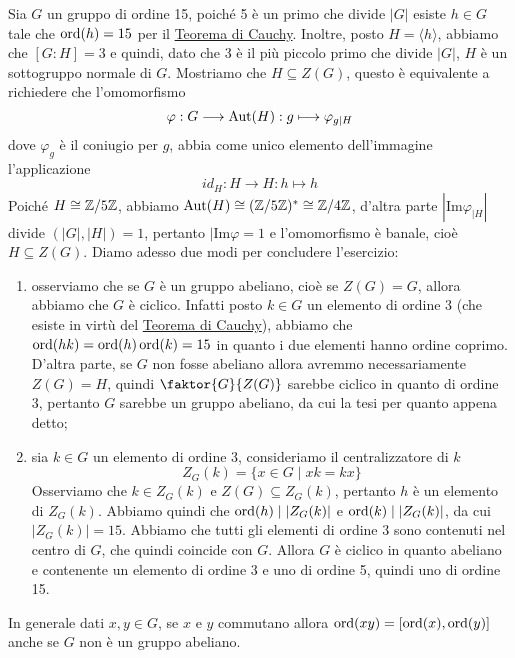 \documentclass[11pt]{scrartcl}
\begin{document}
\begin{soln}
    Sia $G$ un gruppo di ordine 15, poiché 5 è un primo che divide $|G|$
    esiste $h \in G$ tale che $\operatorname{ord}(h) = 15$ per il \hyperref[teorema1.44]{Teorema di Cauchy}.
    Inoltre, posto $H = \langle h\rangle$, abbiamo che $[G:H] = 3$ e quindi,
    dato che 3 è il più piccolo primo che divide $|G|$, $H$ è un sottogruppo 
    normale di $G$. Mostriamo che $H \subseteq Z(G)$, questo è equivalente a 
    richiedere che l'omomorfismo \[
        \varphi: G\longrightarrow \operatorname{Aut}(H) :g\longmapsto \varphi_{g\mid H}
    \]
    dove $\varphi_g$ è il coniugio per $g$, abbia come unico elemento dell'immagine
    l'applicazione
    \[
        id_H:H\longrightarrow H: h \longmapsto h
    \]
    Poiché $H \cong \mathbb{Z}/{5}\mathbb{Z}$, abbiamo $\operatorname{Aut}(H)\cong (\mathbb{Z}/{5}\mathbb{Z})^* \cong \mathbb{Z}/{4}\mathbb{Z}$, d'altra 
    parte $|\mathrm{Im}\varphi_{\mid H}|$ divide $(|G|, |H|) = 1$, pertanto
    $|\mathrm{Im}\varphi = 1$ e l'omomorfismo è banale, cioè $H \subseteq Z(G)$.
    Diamo adesso due modi per concludere l'esercizio:
    \begin{enumerate}[(1)]
        \item osserviamo che se $G$ è un gruppo abeliano, cioè se $Z(G) = G$,
        allora abbiamo che $G$ è ciclico. Infatti posto $k \in G$ un elemento di 
        ordine 3 (che esiste in virtù del \hyperref[teorema1.44]{Teorema di Cauchy}),
        abbiamo che $\operatorname{ord}(hk) = \operatorname{ord}(h)\operatorname{ord}(k) = 15$ in quanto i due elementi hanno
        ordine coprimo. D'altra parte, se $G$ non fosse abeliano allora avremmo 
        necessariamente $Z(G) = H$, quindi $\faktor{G}{Z(G)}$ sarebbe ciclico 
        in quanto di ordine 3, pertanto $G$ sarebbe un gruppo abeliano, da cui 
        la tesi per quanto appena detto;
        \item sia $k \in G$ un elemento di ordine 3, consideriamo il centralizzatore
        di $k$
        \[
            Z_G(k) = \{x \in G\mid xk = kx\}
        \]Osserviamo che $k \in Z_G(k)$ e $Z(G) \subseteq Z_G(k)$, pertanto $h$ è un elemento 
        di $Z_G(k)$. Abbiamo quindi che $\operatorname{ord}(h)\mid |Z_G(k)|$ e $\operatorname{ord}(k)\mid |Z_G(k)|$, 
        da cui $|Z_G(k)| = 15$. Abbiamo che tutti gli elementi di ordine 3
        sono contenuti nel centro di $G$, che quindi coincide con $G$. Allora $G$
        è ciclico in quanto abeliano e contenente un elemento di ordine 3 e uno
        di ordine 5, quindi uno di ordine 15.
    \end{enumerate}
\end{soln}

\begin{remark}
    In generale dati $x, y\in G$, se $x$ e $y$ commutano allora 
    $\operatorname{ord}(xy) = [\operatorname{ord}(x), \operatorname{ord}(y)]$ anche se $G$ non è un gruppo abeliano.
\end{remark}
\end{document}
